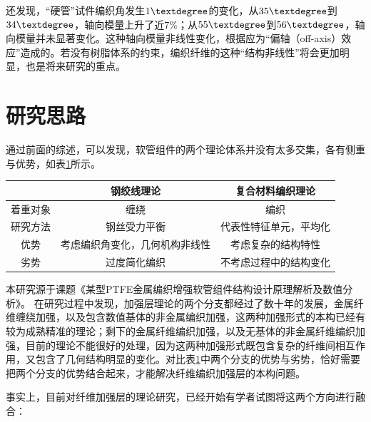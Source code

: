 \citeauthor{Leung2013}还发现，“硬管”试件编织角发生$ 1\textdegree $的变化，从$ 35 \textdegree$到$ 34\textdegree $，轴向模量上升了近$ 7 \% $；从$ 55 \textdegree$到$ 56\textdegree $，轴向模量并未显著变化。这种轴向模量非线性变化，根据\citeauthor{Ishikawa1982}\cite{Ishikawa1982}应为“偏轴（off-axis）效应”造成的。若没有树脂体系的约束，编织纤维的这种“结构非线性”将会更加明显，也是将来研究的重点。









\section{研究思路}


通过前面的综述，可以发现，软管组件的两个理论体系并没有太多交集，各有侧重与优势，如表\ref{tab:hose-specimen}所示。

\begin{table}[!htb]
	\centering
	\label{tab:hose-specimen}
	\begin{tabular*}{1.0\textwidth}{@{\extracolsep{\fill}}>{\hspace{0.5cm}}ccc}
		\toprule
		&      钢绞线理论      &  复合材料编织理论   \\\midrule
		着重对象 &       缠绕        &     编织      \\
		研究方法 &     钢丝受力平衡      & 代表性特征单元，平均化 \\
		优势   & 考虑编织角变化，几何机构非线性 &  考虑复杂的结构特性  \\
		劣势   &     过度简化编织      & 不考虑过程中的结构变化 \\ \bottomrule
	\end{tabular*} 
\end{table}

本研究源于课题《某型PTFE金属编织增强软管组件结构设计原理解析及数值分析》。
  在研究过程中发现，加强层理论的两个分支都经过了数十年的发展，金属纤维缠绕加强，以及包含数值基体的非金属编织加强，这两种加强形式的本构已经有较为成熟精准的理论；剩下的金属纤维编织加强，以及无基体的非金属纤维编织加强，目前的理论不能很好的处理，因为这两种加强形式既包含复杂的纤维间相互作用，又包含了几何结构明显的变化。对比表\ref{tab:hose-specimen}中两个分支的优势与劣势，恰好需要把两个分支的优势结合起来，才能解决纤维编织加强层的本构问题。
  
事实上，目前对纤维加强层的理论研究，已经开始有学者试图将这两个方向进行融合：
\citeauthor{russia1970}\cite{russia1970}

